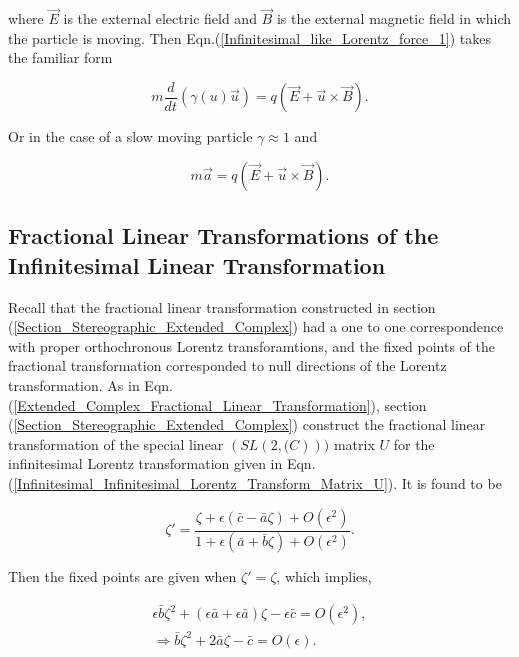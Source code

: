 \noindent where $\vec{E}$ is the external electric field and $\vec{B}$ is the external magnetic field in which the particle is moving. Then Eqn.(\ref{Infinitesimal_like_Lorentz_force_1}) takes the familiar form

\begin{equation*}
m \frac{d}{dt} (\gamma(u) \vec{u}) = q(\vec{E} + \vec{u} \times \vec{B}).
\end{equation*}

\noindent Or in the case of a slow moving particle $\gamma \approx 1$ and 

\begin{equation*}  
m \vec{a} = q (\vec{E} + \vec{u} \times \vec{B}).
\end{equation*}  

\subsection{Fractional Linear Transformations of the Infinitesimal Linear Transformation}

Recall that the fractional linear transformation constructed in section (\ref{Section_Stereographic_Extended_Complex}) had a one to one correspondence with proper orthochronous Lorentz transforamtions, and the fixed points of the fractional transformation corresponded to null directions of the Lorentz transformation. As in Eqn.(\ref{Extended_Complex_Fractional_Linear_Transformation}), section (\ref{Section_Stereographic_Extended_Complex}) construct the fractional linear transformation of the special linear $(SL(2, \mathbb(C)))$ matrix $U$ for the infinitesimal Lorentz transformation given in Eqn.(\ref{Infinitesimal_Infinitesimal_Lorentz_Transform_Matrix_U}). It is found to be

\begin{equation*}   
\zeta' = \frac{\zeta + \epsilon(\bar{c} - \bar{a}\zeta) + O(\epsilon^2)}{1 + \epsilon(\bar{a} + \bar{b} \zeta) + O(\epsilon^2)}.
\end{equation*}

\noindent Then the fixed points are given when $\zeta' = \zeta$, which implies,

\begin{eqnarray}\nonumber
\epsilon \bar{b} \zeta^2 + (\epsilon \bar{a} + \epsilon \bar{a})\zeta - \epsilon \bar{c} = O(\epsilon^2), \\ \label{Infinitesimal_fixed_point_quadratic}
\Rightarrow \bar{b} \zeta^2 + 2 \bar{a} \zeta - \bar{c} = O(\epsilon).
\end{eqnarray}

